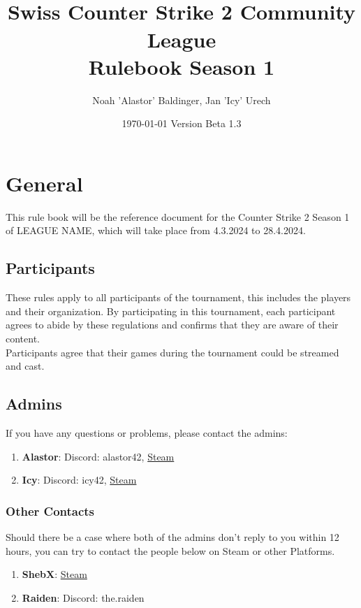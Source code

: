 \documentclass{article}
\title{\name\\ Swiss Counter Strike 2 Community League\\Rulebook Season 1}
\author{Noah 'Alastor' Baldinger, Jan 'Icy' Urech}
\date{\today \hspace{1cm} Version Beta 1.3} %
\def\name{LEAGUE NAME}
\begin{document}
\maketitle
\tableofcontents

\pagebreak
\section{General}
This rule book will be the reference document for the Counter Strike 2 Season 1 of \name, which will take place from 4.3.2024 to 28.4.2024. 

\subsection{Participants}
These rules apply to all participants of the tournament, this includes the players and their organization. By participating in this tournament, each participant agrees to abide by these regulations and confirms that they are aware of their content.\\
Participants agree that their games during the tournament could be streamed and cast.


\subsection{Admins}\label{admins}
If you have any questions or problems, please contact the admins:
\begin{enumerate}
    \item \textbf{Alastor}: Discord: alastor42, \href{https://steamcommunity.com/id/-rotsala-/}{Steam}
    \item \textbf{Icy}: Discord: icy42, \href{https://steamcommunity.com/id/icyq}{Steam}
\end{enumerate}
\subsubsection{Other Contacts}
Should there be a case where both of the admins don't reply to you within 12 hours, you can try to contact the people below on 
Steam or other Platforms.
\begin{enumerate}
    \item \textbf{ShebX}: \href{https://steamcommunity.com/id/ShebX}{Steam}
    \item \textbf{Raiden}: Discord: the.raiden
\end{enumerate}
\end{document}
